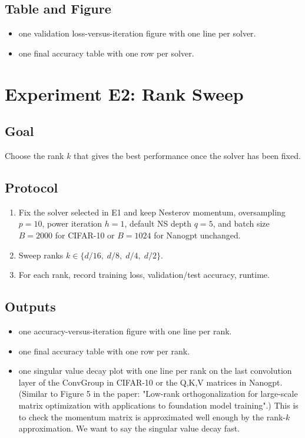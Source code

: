 \documentclass[11pt]{article}
\begin{document}
\subsection{Table and Figure}
\begin{itemize}[nosep]
\item one validation loss-versus-iteration figure with one line per solver.
\item one final accuracy table with one row per solver.
\end{itemize}

\section{Experiment E2: Rank Sweep}

\subsection{Goal}

Choose the rank $k$ that gives the best performance once the solver has been fixed.

\subsection{Protocol}

\begin{enumerate}[nosep]
\item Fix the solver selected in E1 and keep Nesterov momentum, oversampling $p=10$, power iteration $h=1$, default NS depth $q=5$, and batch size $B=2000$ for CIFAR-10 or $B=1024$ for Nanogpt unchanged.
\item Sweep ranks $k \in \{d/16,\; d/8,\; d/4,\; d/2\}$.
\item For each rank, record training loss, validation/test accuracy, runtime.
\end{enumerate}

\subsection{Outputs}
\begin{itemize}[nosep]
\item one accuracy-versus-iteration figure with one line per rank.
\item one final accuracy table with one row per rank.
\item one singular value decay plot with one line per rank on the last convolution layer of the ConvGroup in CIFAR-10 or the Q,K,V matrices in Nanogpt. (Similar to Figure 5 in the paper: "Low-rank orthogonalization for large-scale matrix optimization with applications to foundation model training".) This is to check the momentum matrix is approximated well enough by the rank-$k$ approximation. We want to say the singular value decay fast.
\end{itemize}
\end{document}

